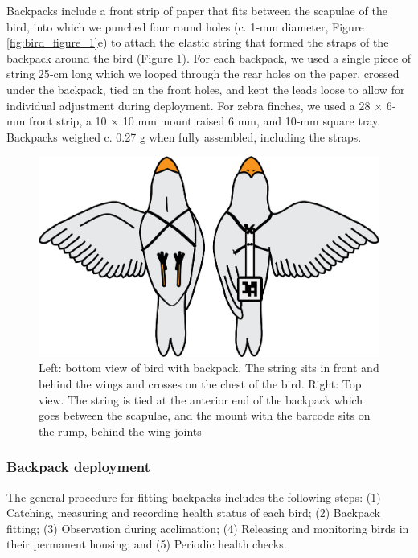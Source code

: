 \documentclass[11pt,a4paper,twoside]{book}
\begin{document}
\begin{doublespace}
Backpacks include a front strip of paper that fits between the scapulae of the bird, into which we punched four round holes (c. 1‐mm diameter, Figure \ref{fig:bird_figure_1}e) to attach the elastic string that formed the straps of the backpack around the bird (Figure \ref{fig:bird_figure_2}). For each backpack, we used a single piece of string 25‐cm long which we looped through the rear holes on the paper, crossed under the backpack, tied on the front holes, and kept the leads loose to allow for individual adjustment during deployment. For zebra finches, we used a 28 $\times$ 6‐mm front strip, a 10 $\times$ 10 mm mount raised 6 mm, and 10‐mm square tray. Backpacks weighed c. 0.27 g when fully assembled, including the straps.

\begin{figure}[!htb]
    \centering
    \includegraphics{Graving_IMPRS_Thesis/figures/bird_figure_2.jpg}
    \caption{Left: bottom view of bird with backpack. The string sits in front and behind the wings and crosses on the chest of the bird. Right: Top view. The string is tied at the anterior end of the backpack which goes between the scapulae, and the mount with the barcode sits on the rump, behind the wing joints}
    \label{fig:bird_figure_2}
\end{figure}
\subsubsection{Backpack deployment}
The general procedure for fitting backpacks includes the following steps: (1) Catching, measuring and recording health status of each bird; (2) Backpack fitting; (3) Observation during acclimation; (4) Releasing and monitoring birds in their permanent housing; and (5) Periodic health checks.


\end{doublespace}
\end{document}
